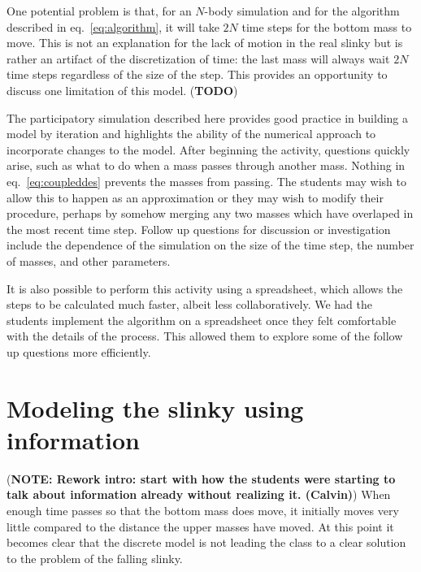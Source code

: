 \documentclass[prb,preprint]{revtex4-1}
\newcommand{\TODO}[1]{\marginpar{\raggedright\scriptsize\textbf{TODO:} #1} (\textbf{TODO})}
\newcommand{\NOTE}[1]{\marginpar{\footnotesize\textbf{NOTE}} (\textbf{NOTE: #1})}
\newcommand{\eq}[1]{eq.~\eqref{eq:#1}}
\begin{document}
One potential problem is that, for an $N$-body simulation and for the algorithm described in \eq{algorithm},
it will take $2N$ time steps for the bottom mass to move. This is not an explanation for
the lack of motion in the real slinky but is rather an artifact of the discretization of time:
the last mass will always wait $2N$ time steps regardless of the size of the step.
This provides an opportunity to discuss one limitation of this model.\TODO{more below}

The participatory simulation described here provides good practice in building
a model by iteration and highlights the ability of the numerical approach to incorporate changes to the model. After beginning the activity, questions quickly arise, such
as what to do when a mass passes through another mass. Nothing in \eq{coupleddes} prevents
the masses from passing. The students may wish to allow this to happen as an approximation
or they may wish to modify their procedure, perhaps by somehow merging any two masses which have overlaped
in the most recent time step. Follow up questions for discussion or investigation include
the dependence of the simulation on the size of the time step, the number of masses,
and other parameters.

It is also possible to perform this activity using a spreadsheet, which allows the steps to be
calculated much faster, albeit less collaboratively. We had the students implement the algorithm on a spreadsheet once they
felt comfortable with the details of the process. This allowed them to explore some of the follow
up questions more efficiently.

\section{Modeling the slinky using information}
\label{sec:information}

\NOTE{Rework intro: start with how the students were starting to talk about information already without realizing it. (Calvin)}
When enough time passes so that the bottom mass does move, it initially moves very little compared 
to the distance the upper masses have moved. At this point it becomes clear that the discrete model
is not leading the class to a clear solution to the problem of the falling slinky.
\end{document}
